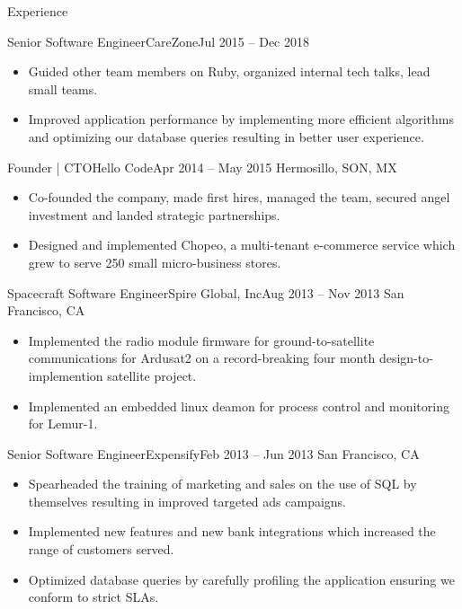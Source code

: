 \documentclass[calibri]{mcdowellcv}
\begin{document}
\begin{cvsection}{Experience}
\begin{cvsubsection}{Senior Software Engineer}{CareZone}{Jul 2015 -- Dec 2018}
\begin{itemize}
			\item Guided other team members on Ruby, organized internal tech talks, lead small teams.
			\item Improved application performance by implementing more efficient algorithms and optimizing our database queries resulting in better user experience.
		\end{itemize}
	\end{cvsubsection}
	\vskip 0.3in
	\begin{cvsubsection}{Founder | CTO}{Hello Code}{Apr 2014 -- May 2015}
		Hermosillo, SON, MX
		\begin{itemize}%
			\item Co-founded the company, made first hires, managed the team, secured angel investment and landed strategic partnerships.
			\item Designed and implemented Chopeo, a multi-tenant e-commerce service which grew to serve 250 small micro-business stores.
		\end{itemize}
	\end{cvsubsection}
	\vskip 0.3in
	\begin{cvsubsection}{Spacecraft Software Engineer}{Spire Global, Inc}{Aug 2013 -- Nov 2013}
		San Francisco, CA
		\begin{itemize}%
			\item Implemented the radio module firmware for ground-to-satellite communications for Ardusat2 on a record-breaking four month design-to-implemention satellite project.
			\item Implemented an embedded linux deamon for process control and monitoring for Lemur-1.
		\end{itemize}
	\end{cvsubsection}
	\vskip 0.3in
	\begin{cvsubsection}{Senior Software Engineer}{Expensify}{Feb 2013 -- Jun 2013}
		San Francisco, CA
		\begin{itemize}%
			\item Spearheaded the training of marketing and sales on the use of SQL by themselves resulting in improved targeted ads campaigns.
			\item Implemented new features and new bank integrations which increased the range of customers served.
			\item Optimized database queries by carefully profiling the application ensuring we conform to strict SLAs.
		\end{itemize}
	\end{cvsubsection}
	\vskip 0.3in

\end{cvsection}
\end{document}
